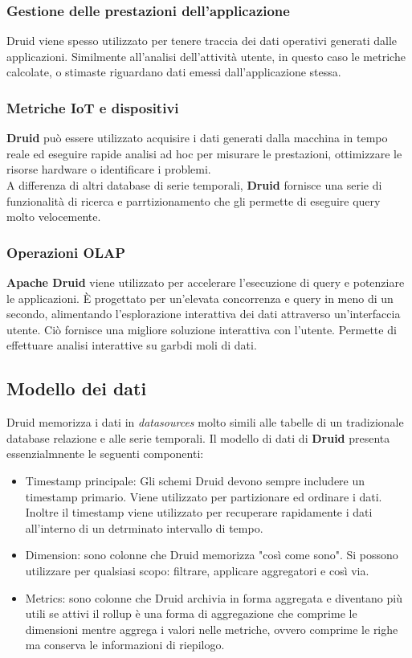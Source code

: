 \documentclass{article}
\begin{document}
\subsubsection{Gestione delle prestazioni dell'applicazione}
Druid viene spesso utilizzato per tenere traccia dei dati operativi generati dalle applicazioni.
Similmente all'analisi dell'attività utente, in questo caso le metriche calcolate, o stimaste riguardano dati emessi dall'applicazione stessa.
\subsubsection{Metriche IoT e dispositivi}
\textbf{Druid} può essere utilizzato acquisire i dati generati dalla macchina in tempo reale ed eseguire rapide analisi ad hoc per misurare le prestazioni, ottimizzare le risorse hardware o identificare i problemi.\\
A differenza di altri database di serie temporali, \textbf{Druid} fornisce una serie di funzionalità di ricerca e parrtizionamento che gli permette di eseguire query molto velocemente.
\subsubsection{Operazioni OLAP}
\textbf{Apache Druid} viene utilizzato per accelerare l'esecuzione di query e potenziare le applicazioni. È progettato per un'elevata concorrenza e query in meno di un secondo, alimentando l'esplorazione interattiva dei dati attraverso un'interfaccia utente. Ciò fornisce una migliore soluzione interattiva con l'utente. Permette di effettuare analisi interattive su garbdi moli di dati.
\subsection{Modello dei dati}
Druid memorizza i dati in \textit{datasources} molto simili alle tabelle di un tradizionale database relazione e alle serie temporali.
Il modello di dati di \textbf{Druid} presenta essenzialmnente le seguenti componenti:
\begin{itemize}
    \item Timestamp principale: Gli schemi Druid devono sempre includere un timestamp primario. Viene utilizzato per partizionare ed ordinare i dati. Inoltre il timestamp viene utilizzato per recuperare rapidamente i dati all'interno di un detrminato intervallo di tempo.
    \item Dimension: sono colonne che Druid memorizza "così come sono". Si possono utilizzare per qualsiasi scopo: filtrare, applicare aggregatori e così via.
    \item Metrics: sono colonne che Druid archivia in forma aggregata e diventano più utili se attivi il rollup è una forma di aggregazione che comprime le dimensioni mentre aggrega i valori nelle metriche, ovvero comprime le righe ma conserva le informazioni di riepilogo.
\end{itemize}
\pagebreak
\end{document}
